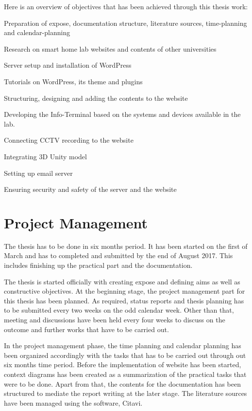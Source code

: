 Here is an overview of objectives that has been achieved through this thesis work:
\begin{itemize*}
\item Preparation of expose, documentation structure, literature sources, time-planning and calendar-planning
\item Research on smart home lab websites and contents of other universities
\item Server setup and installation of WordPress
\item Tutorials on WordPress, its theme and plugins
\item Structuring, designing and adding the contents to the website
\item Developing the Info-Terminal based on the systems and devices available in the lab.
\item Connecting CCTV recording to the website
\item Integrating 3D Unity model
\item Setting up email server
\item Ensuring security and safety of the server and the website
\end{itemize*}

\section{Project Management}
The thesis has to be done in six months period. It has been started on the first of March and has to completed and submitted by the end of August 2017. This includes finishing up the practical part and the documentation.

The thesis is started officially with creating expose and defining aims as well as constructive objectives. At the beginning stage, the project management part for this thesis has been planned. As required, status reports and thesis planning has to be submitted every two weeks on the odd calendar week. Other than that, meeting and discussions have been held every four weeks to discuss on the outcome and further works that have to be carried out.

In the project management phase, the time planning and calendar planning has been organized accordingly with the tasks that has to be carried out through out six months time period. Before the implementation of website has been started, context diagrams has been created as a summarization of the practical tasks that were to be done. Apart from that, the contents for the documentation has been structured to mediate the report writing at the later stage. The literature sources have been managed using the software, Citavi.

